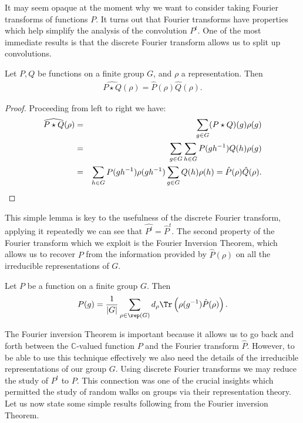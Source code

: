\documentclass[11pt]{report}
\begin{document}
It may seem opaque at the moment why we want to consider taking Fourier 
transforms of functions $P$. It turns out that Fourier transforms have 
properties which help simplify the analysis of the convolution $P^{t}$. One of the most immediate results is that the discrete Fourier transform allows us to split up convolutions.

\begin{lemma}
	Let $P,Q$ be functions on  a finite group $G$, and $\rho$ a representation. 
	Then
	\begin{eqnarray}
	\widehat{P\star Q}(\rho) = \hat{P}(\rho)\hat{Q}(\rho).
	\end{eqnarray}
\end{lemma}

\begin{proof}
	Proceeding from left to right we have:
	\begin{eqnarray*}
		\widehat{P\star Q}(\rho) & = & \sum_{g\in G} (P\star Q)(g) \rho(g) \\
		& = & \sum_{g \in G}\sum_{h\in G} P(gh^{-1})Q(h) \rho(g) \\
		& = & \sum_{h \in G} P(gh^{-1}) \rho(gh^{-1}) \sum_{g \in G} Q(h) 
		\rho(h) = \hat{P}(\rho)\hat{Q}(\rho). \qedhere
	\end{eqnarray*}
\end{proof}

This simple lemma is key to the usefulness of the discrete Fourier transform, applying it repeatedly we can see that $\widehat{P^{t}} = 
\hat{P}^{t}$. 
The second property of the Fourier transform which we exploit is the Fourier Inversion Theorem, which allows us to 
recover $P$ from the information provided by $\hat{P}(\rho)$ on all the irreducible representations of $G$.

\begin{lemma}
	Let $P$ be a function on  a finite group $G$. Then
	\begin{eqnarray}
	\label{chpt3:eqn:fourinv}
	P(g) = \frac{1}{|G|}\sum_{\rho \in \rep(G)} d_{\rho} 
	\Tr\left(\rho(g^{-1})\hat{P}(\rho)\right).
	\end{eqnarray}
\end{lemma}


The Fourier inversion Theorem is important because it allows us to go back and 
forth between the $\mathbb{C}$-valued function $P$ and the Fourier transform $\hat{P}$.  However, to be able to use 
this technique effectively we also need the details of the irreducible 
representations of our group $G$. Using discrete Fourier transforms we may reduce the study of $P^{t}$ to $P$. This connection was one of the crucial insights which permitted the study of random walks on groups via their representation theory.
Let us now state some simple results following from the Fourier inversion 
Theorem.
\end{document}
